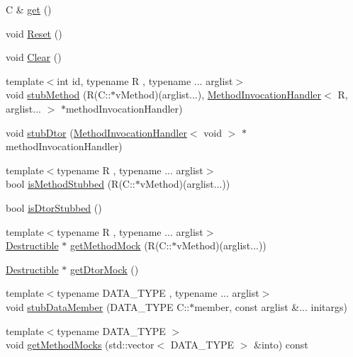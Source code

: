 \begin{DoxyCompactItemize}
\item 
C \& \mbox{\hyperlink{structfakeit_1_1DynamicProxy_af8e4100c2d995a26bf3209e68c11d12a}{get}} ()
\item 
void \mbox{\hyperlink{structfakeit_1_1DynamicProxy_a8f00dd7c68a247f715ec3925f662de9f}{Reset}} ()
\item 
void \mbox{\hyperlink{structfakeit_1_1DynamicProxy_a995c7e3dd97dc7707f18774eb4554b45}{Clear}} ()
\item 
{\footnotesize template$<$int id, typename R , typename ... arglist$>$ }\\void \mbox{\hyperlink{structfakeit_1_1DynamicProxy_ab1a98295698cf6eed3ff04ed4b838e51}{stub\+Method}} (R(C\+::$\ast$v\+Method)(arglist...), \mbox{\hyperlink{structfakeit_1_1MethodInvocationHandler}{Method\+Invocation\+Handler}}$<$ R, arglist... $>$ $\ast$method\+Invocation\+Handler)
\item 
void \mbox{\hyperlink{structfakeit_1_1DynamicProxy_a8ab5aa831398c6ee27cbdb12ee1f15cf}{stub\+Dtor}} (\mbox{\hyperlink{structfakeit_1_1MethodInvocationHandler}{Method\+Invocation\+Handler}}$<$ void $>$ $\ast$method\+Invocation\+Handler)
\item 
{\footnotesize template$<$typename R , typename ... arglist$>$ }\\bool \mbox{\hyperlink{structfakeit_1_1DynamicProxy_aeccdd2a03ebbf8eecc3291ebe6ccbfc4}{is\+Method\+Stubbed}} (R(C\+::$\ast$v\+Method)(arglist...))
\item 
bool \mbox{\hyperlink{structfakeit_1_1DynamicProxy_a6d3f0dfa93dc98b37fb50002bc4ea2bc}{is\+Dtor\+Stubbed}} ()
\item 
{\footnotesize template$<$typename R , typename ... arglist$>$ }\\\mbox{\hyperlink{classfakeit_1_1Destructible}{Destructible}} $\ast$ \mbox{\hyperlink{structfakeit_1_1DynamicProxy_a9774578f92b4d0258c72192dd16d6d0e}{get\+Method\+Mock}} (R(C\+::$\ast$v\+Method)(arglist...))
\item 
\mbox{\hyperlink{classfakeit_1_1Destructible}{Destructible}} $\ast$ \mbox{\hyperlink{structfakeit_1_1DynamicProxy_a32f8a09734ef6d70162d682fd593707b}{get\+Dtor\+Mock}} ()
\item 
{\footnotesize template$<$typename D\+A\+T\+A\+\_\+\+T\+Y\+PE , typename ... arglist$>$ }\\void \mbox{\hyperlink{structfakeit_1_1DynamicProxy_a872480e95dba48c6e690fb7cdc017f9d}{stub\+Data\+Member}} (D\+A\+T\+A\+\_\+\+T\+Y\+PE C\+::$\ast$member, const arglist \&... initargs)
\item 
{\footnotesize template$<$typename D\+A\+T\+A\+\_\+\+T\+Y\+PE $>$ }\\void \mbox{\hyperlink{structfakeit_1_1DynamicProxy_a21e8fdd6bcf64b2d7e0b86261529da35}{get\+Method\+Mocks}} (std\+::vector$<$ D\+A\+T\+A\+\_\+\+T\+Y\+PE $>$ \&into) const

\end{DoxyCompactItemize}
